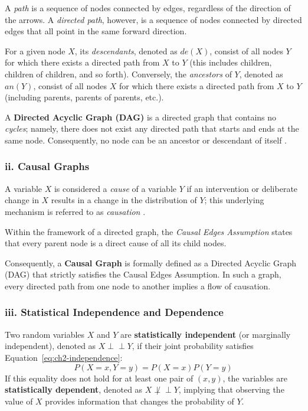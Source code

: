 A \textit{path} is a sequence of nodes connected by edges, regardless of the direction of the arrows. A \textit{directed path}, however, is a sequence of nodes connected by directed edges that all point in the same forward direction. 

For a given node $X$, its \textit{descendants}, denoted as $de(X)$, consist of all nodes $Y$ for which there exists a directed path from $X$ to $Y$ (this includes children, children of children, and so forth). 
Conversely, the \textit{ancestors} of $Y$, denoted as $an(Y)$, consist of all nodes $X$ for which there exists a directed path from $X$ to $Y$ (including parents, parents of parents, etc.).

A \textbf{Directed Acyclic Graph (DAG)} is a directed graph that contains no \textit{cycles}; namely, there does not exist any directed path that starts and ends at the same node. Consequently, no node can be an ancestor or descendant of itself \cite{neal2020}.

\subsubsection*{ii. Causal Graphs}

A variable $X$ is considered a \textit{cause} of a variable $Y$ if an intervention or deliberate change in $X$ results in a change in the distribution of $Y$; this underlying mechanism is referred to as \textit{causation} \cite{neal2020}.

Within the framework of a directed graph, the \textit{Causal Edges Assumption} states that every parent node is a direct cause of all its child nodes. 

Consequently, a \textbf{Causal Graph} is formally defined as a Directed Acyclic Graph (DAG) that strictly satisfies the Causal Edges Assumption. In such a graph, every directed path from one node to another implies a flow of causation.

\subsubsection*{iii. Statistical Independence and Dependence}

Two random variables $X$ and $Y$ are \textbf{statistically independent} (or marginally independent), denoted as $X \perp\!\!\!\perp Y$, if their joint probability satisfies Equation~\eqref{eq:ch2-independence}:
\begin{equation}
    \label{eq:ch2-independence}
    P(X=x, Y=y) = P(X=x)P(Y=y)
\end{equation}
If this equality does not hold for at least one pair of $(x, y)$, the variables are \textbf{statistically dependent}, denoted as $X \not\perp\!\!\!\perp Y$, implying that observing the value of $X$ provides information that changes the probability of $Y$.

